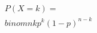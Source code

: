 \documentclass[preview]{standalone}
\begin{document}
\begin{align*}
P(X=k) = \\binom{n}{k} p^k (1-p)^{n-k}
\end{align*}
\end{document}
